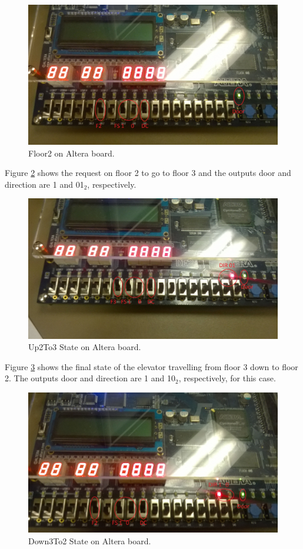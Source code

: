 \documentclass[journal]{IEEEtran}
\begin{document}
\begin{figure}[h]
\centering
\includegraphics[width=0.9\linewidth]{Floor2.jpg}
\caption{Floor2 on Altera board.}
\label{floor2}
\end{figure}

Figure \ref{up2to3} shows the request on floor 2 to go to floor 3 and the outputs door and direction are 1 and 01$_{2}$, respectively. 

\begin{figure}[h]
\centering
\includegraphics[width=0.9\linewidth]{Up2To3.jpg}
\caption{Up2To3 State on Altera board.}
\label{up2to3}
\end{figure}

Figure \ref{down3to2} shows the final state of the elevator travelling from floor 3 down to floor 2. The outputs door and direction are 1 and 10$_{2}$, respectively, for this case.

\begin{figure}[h]
\centering
\includegraphics[width=0.9\linewidth]{Down3To2.jpg}
\caption{Down3To2 State on Altera board.}
\label{down3to2}
\end{figure}
\end{document}
